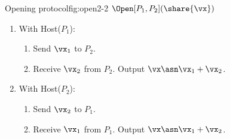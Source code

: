 \begin{Boxfig}{Opening protocol}{fig:open2-2}
  {$\Open[P_1, P_2](\share{\vx})$}
  \begin{enumerate}
    \item With Host($P_1$):
  \begin{enumerate}
    \item Send $\vx_1$ to $P_2$.
    \item Receive $\vx_2$ from $P_2$. Output $\vx \asn \vx_1 + \vx_2$.
  \end{enumerate}
  \item With Host($P_2$):
  \begin{enumerate}
    \item Send $\vx_2$ to $P_1$.
    \item Receive $\vx_1$ from $P_1$. Output $\vx \asn \vx_1 + \vx_2$.
  \end{enumerate}
\end{enumerate}
\end{Boxfig}







